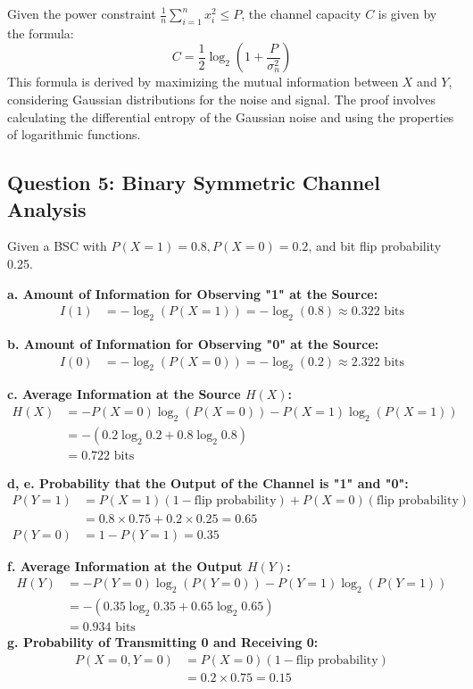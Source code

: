 \documentclass{article}
\begin{document}
Given the power constraint \( \frac{1}{n} \sum_{i=1}^{n} x_i^2 \leq P \), the channel capacity \( C \) is given by the formula:
\[ C = \frac{1}{2} \log_2 \left(1 + \frac{P}{\sigma_n^2}\right) \]
This formula is derived by maximizing the mutual information between \( X \) and \( Y \), considering Gaussian distributions for the noise and signal. The proof involves calculating the differential entropy of the Gaussian noise and using the properties of logarithmic functions. 

\subsection*{Question 5: Binary Symmetric Channel Analysis}
Given a BSC with \( P(X=1) = 0.8, P(X=0) = 0.2 \), and bit flip probability 0.25.

\textbf{a. Amount of Information for Observing "1" at the Source:}
\begin{align*}
    I(1) &= -\log_2(P(X=1)) = -\log_2(0.8) \approx 0.322 \text{ bits}
\end{align*}

\textbf{b. Amount of Information for Observing "0" at the Source:}
\begin{align*}
    I(0) &= -\log_2(P(X=0)) = -\log_2(0.2) \approx 2.322 \text{ bits}
\end{align*}

\textbf{c. Average Information at the Source \( H(X) \):}
\begin{align*}
    H(X) &= -P(X=0)\log_2(P(X=0)) - P(X=1)\log_2(P(X=1)) \\
    &= -(0.2 \log_2 0.2 + 0.8 \log_2 0.8) \\
    &= 0.722 \text{ bits}
\end{align*}

\textbf{d, e. Probability that the Output of the Channel is "1" and "0":}
\begin{align*}
    P(Y=1) &= P(X=1)(1 - \text{flip probability}) + P(X=0)(\text{flip probability}) \\
    &= 0.8 \times 0.75 + 0.2 \times 0.25 = 0.65 \\
    P(Y=0) &= 1 - P(Y=1) = 0.35
\end{align*}

\textbf{f. Average Information at the Output \( H(Y) \):}
\begin{align*}
    H(Y) &= -P(Y=0)\log_2(P(Y=0)) - P(Y=1)\log_2(P(Y=1)) \\
    &= -(0.35 \log_2 0.35 + 0.65 \log_2 0.65) \\
    &= 0.934 \text{ bits}
\end{align*}
\textbf{g. Probability of Transmitting 0 and Receiving 0:}
\begin{align*}
    P(X=0, Y=0) &= P(X=0)(1 - \text{flip probability}) \\
    &= 0.2 \times 0.75 = 0.15
\end{align*}
\end{document}
